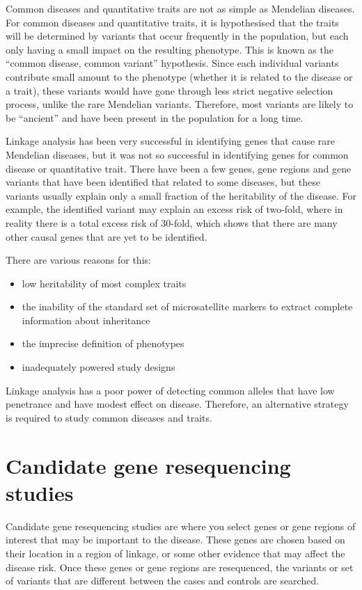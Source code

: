 Common diseases and quantitative traits are not as simple as Mendelian diseases.
For common diseases and quantitative traits, it is hypothesised that the traits will be determined by variants that occur frequently in the population, but each only having a small impact on the resulting phenotype.
This is known as the ``common disease, common  variant'' hypothesis.
Since each individual variants contribute small amount to the phenotype (whether it is related to the disease or a trait), these variants would have gone through less strict negative selection process, unlike the rare Mendelian variants.
Therefore, most variants are likely to be ``ancient'' and have been present in the population for a long time.

Linkage analysis has been very successful in identifying genes that cause rare Mendelian diseases, but it was not so successful in identifying genes for common disease or quantitative trait.
There have been a few genes, gene regions and gene variants that have been identified that related to some diseases, but these variants usually explain only a small fraction of the \gls{heritability} of the disease.
For example, the identified variant may explain an excess risk of two-fold, where in reality there is a total excess risk of 30-fold, which shows that there are many other causal genes that are yet to be identified.

There are various reasons for this:
\begin{itemize}[noitemsep]
	\item low \gls{heritability} of most complex traits
	\item the inability of the standard set of microsatellite markers to extract complete information about inheritance
	\item the imprecise definition of phenotypes
	\item inadequately powered study designs
\end{itemize}
Linkage analysis has a poor power of detecting common alleles that have low penetrance and have modest effect on disease.
Therefore, an alternative strategy is required to study common diseases and traits.

\section{Candidate gene resequencing studies}
\label{sec:candidate_gene_resequencing_studies}

Candidate gene resequencing studies are where you select genes or gene regions of interest that may be important to the disease.
These genes are chosen based on their location in a region of linkage, or some other evidence that may affect the disease risk.
Once these genes or gene regions are resequenced, the variants or set of variants that are different between the cases and controls are searched.

